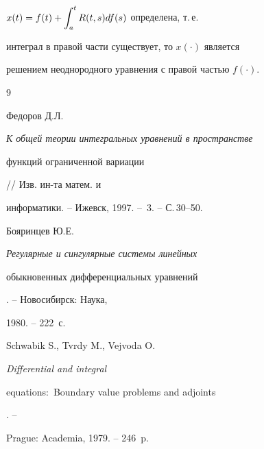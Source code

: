 $x(t)=f(t)+\displaystyle\int_a^tR(t,s)df(s)$ определена, т.\,е.


интеграл в правой части существует, то $x(\cdot)$ является


решением неоднородного уравнения с правой частью $f(\cdot).$





\begin{thebibliography}{9}







Федоров Д.Л. {\em К общей теории интегральных уравнений в пространстве


функций ограниченной вариации} // Изв. ин-та матем. и


информатики. -- Ижевск, 1997. -- \No\,3. -- С.\,30--50.




Бояринцев Ю.Е. {\em Регулярные и сингулярные системы линейных


обыкновенных дифференциальных уравнений}. -- Новосибирск: Наука,


1980. -- 222~с.




Schwabik S., Tvrdy M., Vejvoda O. {\em Differential and integral


equations$:$ Boundary value problems and adjoints}. --


Prague: Academia, 1979. -- 246~p.





\end{thebibliography}





\vskip 2cm












\label{end}





